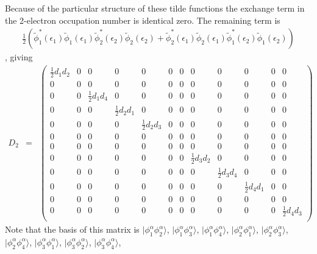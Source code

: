 \documentclass[aip,graphicx]{revtex4-1}
\begin{document}
\begin{itemize}
         Because of the particular structure of these tilde functions the exchange term in the
         2-electron occupation number is identical zero. The remaining term is 
         \begin{eqnarray} 
         \frac{1}{2}\left(\tilde{\phi}_1^*(\epsilon_1)\tilde{\phi}_1(\epsilon_1)\tilde{\phi}_2^*(\epsilon_2)\tilde{\phi}_2(\epsilon_2)+\tilde{\phi}_2^*(\epsilon_1)\tilde{\phi}_2(\epsilon_1)\tilde{\phi}_1^*(\epsilon_2)\tilde{\phi}_1(\epsilon_2)\right)
         \end{eqnarray}, 
         giving
         \begin{eqnarray}
         \label{Eq:D2aa-1-electron}
         D_2 &=&
         \begin{pmatrix}
         \frac{1}{2}d_1 d_2 & 0 & 0 & 0 & 0 & 0 & 0 & 0 & 0 & 0 & 0 & 0 \\
         0 & 0 & 0 & 0 & 0 & 0 & 0 & 0 & 0 & 0 & 0 & 0 \\
         0 & 0 & \frac{1}{2}d_1 d_4 & 0 & 0 & 0 & 0 & 0 & 0 & 0 & 0 & 0 \\
         0 & 0 & 0 & \frac{1}{2}d_2 d_1 & 0 & 0 & 0 & 0 & 0 & 0 & 0 & 0 \\
         0 & 0 & 0 & 0 & \frac{1}{2}d_2 d_3 & 0 & 0 & 0 & 0 & 0 & 0 & 0 \\
         0 & 0 & 0 & 0 & 0 & 0 & 0 & 0 & 0 & 0 & 0 & 0 \\
         0 & 0 & 0 & 0 & 0 & 0 & 0 & 0 & 0 & 0 & 0 & 0 \\
         0 & 0 & 0 & 0 & 0 & 0 & 0 & \frac{1}{2}d_3 d_2 & 0 & 0 & 0 & 0 \\
         0 & 0 & 0 & 0 & 0 & 0 & 0 & 0 & \frac{1}{2}d_3 d_4 & 0 & 0 & 0  \\
         0 & 0 & 0 & 0 & 0 & 0 & 0 & 0 & 0 & \frac{1}{2}d_4 d_1 & 0 & 0  \\
         0 & 0 & 0 & 0 & 0 & 0 & 0 & 0 & 0 & 0 & 0 & 0  \\
         0 & 0 & 0 & 0 & 0 & 0 & 0 & 0 & 0 & 0 & 0 & \frac{1}{2}d_4 d_3  \\
         \end{pmatrix}
         \end{eqnarray}
         Note that the basis of this matrix is $|\phi^\alpha_1\phi^\alpha_2\rangle$,
         $|\phi^\alpha_1\phi^\alpha_3\rangle$, $|\phi^\alpha_1\phi^\alpha_4\rangle$,
         $|\phi^\alpha_2\phi^\alpha_1\rangle$, $|\phi^\alpha_2\phi^\alpha_3\rangle$,
         $|\phi^\alpha_2\phi^\alpha_4\rangle$, $|\phi^\alpha_3\phi^\alpha_1\rangle$,
         $|\phi^\alpha_3\phi^\alpha_2\rangle$, $|\phi^\alpha_3\phi^\alpha_4\rangle$,

\end{itemize}
\end{document}

